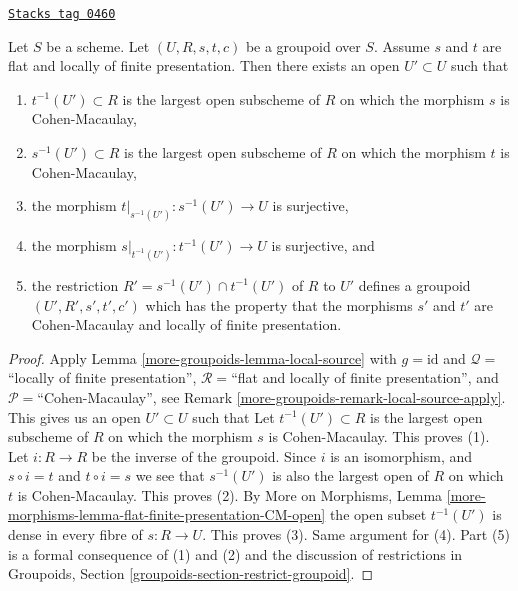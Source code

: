 \begin{lemma}[Make CM]
\label{more-groupoids-lemma-make-CM}
\href{https://stacks.math.columbia.edu/tag/0460}{\texttt{Stacks tag 0460}}

Let $S$ be a scheme.
Let $(U, R, s, t, c)$ be a groupoid over $S$.
Assume $s$ and $t$ are flat and locally of finite presentation.
Then there exists an open $U' \subset U$ such that
\begin{enumerate}
\item $t^{-1}(U') \subset R$ is the largest open subscheme of
$R$ on which the morphism $s$ is Cohen-Macaulay,
\item $s^{-1}(U') \subset R$ is the largest open subscheme of
$R$ on which the morphism $t$ is Cohen-Macaulay,
\item the morphism $t|_{s^{-1}(U')} : s^{-1}(U') \to U$ is
surjective,
\item the morphism $s|_{t^{-1}(U')} : t^{-1}(U') \to U$ is
surjective, and
\item the restriction $R' = s^{-1}(U') \cap t^{-1}(U')$
of $R$ to $U'$ defines a groupoid $(U', R', s', t', c')$ which has the property
that the morphisms $s'$ and $t'$ are Cohen-Macaulay and locally of
finite presentation.
\end{enumerate}
\end{lemma}

\begin{proof}
Apply
Lemma \ref{more-groupoids-lemma-local-source}
with
$g = \text{id}$ and
$\mathcal{Q} =$``locally of finite presentation'',
$\mathcal{R} =$``flat and locally of finite presentation'', and
$\mathcal{P}=$``Cohen-Macaulay'', see
Remark \ref{more-groupoids-remark-local-source-apply}.
This gives us an open $U' \subset U$ such that
Let $t^{-1}(U') \subset R$ is the largest open subscheme of $R$
on which the morphism $s$ is Cohen-Macaulay.
This proves (1).
Let $i : R \to R$ be the inverse of the groupoid.
Since $i$ is an isomorphism, and $s \circ i = t$ and $t \circ i = s$
we see that $s^{-1}(U')$ is also the largest open of $R$ on which $t$ is
Cohen-Macaulay. This proves (2).
By
More on Morphisms,
Lemma \ref{more-morphisms-lemma-flat-finite-presentation-CM-open}
the open subset $t^{-1}(U')$ is dense in every fibre of $s : R \to U$.
This proves (3). Same argument for (4).
Part (5) is a formal consequence of (1) and (2) and the discussion
of restrictions in
Groupoids, Section \ref{groupoids-section-restrict-groupoid}.
\end{proof}

